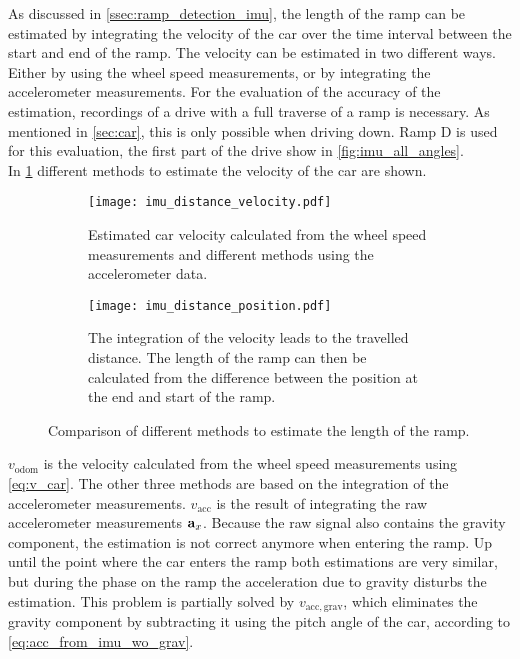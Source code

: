 As discussed in \cref{ssec:ramp_detection_imu}, the length of the ramp can be estimated by integrating the velocity of the car over the time interval between the start and end of the ramp.
The velocity can be estimated in two different ways.
Either by using the wheel speed measurements, or by integrating the accelerometer measurements.
For the evaluation of the accuracy of the estimation, recordings of a drive with a full traverse of a ramp is necessary.
As mentioned in \cref{sec:car}, this is only possible when driving down.
Ramp D is used for this evaluation, the first part of the drive show in \cref{fig:imu_all_angles}.\\
In \cref{fig:imu_distance_velocity} different methods to estimate the velocity of the car are shown.
\begin{figure}[htb]
	\centering
	\begin{subfigure}{1\textwidth}
		\centering
		\texttt{[image: imu\_distance\_velocity.pdf]}
		\caption[Car velocity estimation]{Estimated car velocity calculated from the wheel speed measurements and different methods using the accelerometer data.}
		\label{fig:imu_distance_velocity}
	\end{subfigure}
	
	\begin{subfigure}{1\textwidth}
		\centering
		\texttt{[image: imu\_distance\_position.pdf]}
		\caption[Car travelled distance estimation]{The integration of the velocity leads to the travelled distance. The length of the ramp can then be calculated from the difference between the position at the end and start of the ramp.}
		\label{fig:imu_distance_position}
	\end{subfigure}
	\caption[Ramp length estimation using various methods]{Comparison of different methods to estimate the length of the ramp.}
\end{figure}
$v_\mathrm{odom}$ is the velocity calculated from the wheel speed measurements using \cref{eq:v_car}.
The other three methods are based on the integration of the accelerometer measurements.
$v_\mathrm{acc}$ is the result of integrating the raw accelerometer measurements $\vb{a}_x$.
Because the raw signal also contains the gravity component, the estimation is not correct anymore when entering the ramp.
Up until the point where the car enters the ramp both estimations are very similar, but during the phase on the ramp the acceleration due to gravity disturbs the estimation.
This problem is partially solved by $v_\mathrm{acc, grav}$, which eliminates the gravity component by subtracting it using the pitch angle of the car, according to \cref{eq:acc_from_imu_wo_grav}.
